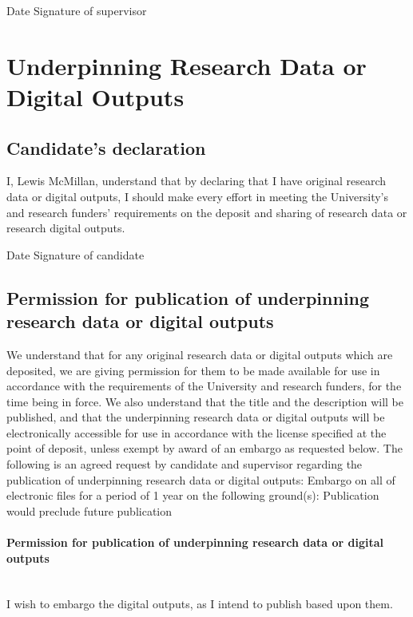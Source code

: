\documentclass[10pt,a4paper,twoside]{book}
\begin{document}
\medskip

\indent Date\dotfill \hspace{1cm} Signature of supervisor \dotfill

\section*{Underpinning Research Data or Digital Outputs}

\subsection*{Candidate's declaration}

I, Lewis McMillan, understand that by declaring that I have original research data or digital outputs, I should make every effort in meeting the University's and research funders' requirements on the deposit and sharing of research data or research digital outputs. 

\medskip

Date\dotfill \hspace{1cm} Signature of candidate \dotfill

\subsection*{Permission for publication of underpinning research data or digital outputs}

We understand that for any original research data or digital outputs which are deposited, we are giving permission for them to be made available for use in accordance with the requirements of the University and research funders, for the time being in force.
We also understand that the title and the description will be published, and that the underpinning research data or digital outputs will be electronically accessible for use in accordance with the license specified at the point of deposit, unless exempt by award of an embargo as requested below.
The following is an agreed request by candidate and supervisor regarding the publication of underpinning research data or digital outputs:
Embargo on all of electronic files for a period of 1 year on the following ground(s):
Publication would preclude future publication 

\paragraph*{Permission for publication of underpinning research data or digital outputs}\hspace*{0pt}\\
I wish to embargo the digital outputs, as I intend to publish based upon them.
\end{document}
